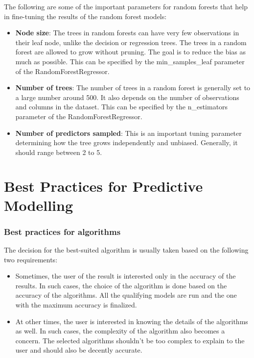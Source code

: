 \documentclass{article}
\numberwithin{equation}{section} %
\begin{document}
The following are some of the important parameters for random forests that help in
fine-tuning the results of the random forest models:

\begin{itemize}
	\item \textbf{Node size}: The trees in random forests can have very few observations in their leaf node, unlike the decision or regression trees. The trees in a random forest are allowed to grow without pruning. The goal is to reduce the bias as much as possible. This can be specified by the min\_samples\_leaf parameter of the RandomForestRegressor.
	\item \textbf{Number of trees}: The number of trees in a random forest is generally set to a large number around 500. It also depends on the number of observations and columns in the dataset. This can be specified by the n\_estimators parameter of the RandomForestRegressor.
	\item \textbf{Number of predictors sampled}: This is an important tuning parameter determining how the tree grows independently and unbiased. Generally, it should range between 2 to 5.
\end{itemize}


\newpage

\section*{Best Practices for Predictive Modelling}

\subsubsection*{Best practices for algorithms}

The decision for the best-suited algorithm is usually taken based on the following two requirements:

\begin{itemize}
	\item Sometimes, the user of the result is interested only in the accuracy of the results. In such cases, the choice of the algorithm is done based on the
	accuracy of the algorithms. All the qualifying models are run and the one with the maximum accuracy is finalized.
	\item At other times, the user is interested in knowing the details of the algorithms as well. In such cases, the complexity of the algorithm also becomes a concern. The selected algorithms shouldn't be too complex to explain
	to the user and should also be decently accurate.
\end{itemize}
\end{document}
